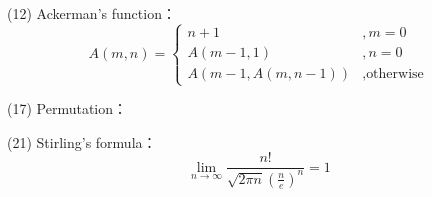 \item \begin{theorem}{(12)} Ackerman's function：\begin{equation}
        A(m, n) = \begin{cases}
            n + 1 &, m = 0 \\
            A(m - 1, 1) &, n = 0 \\
            A(m - 1, A(m, n - 1)) &, \text{otherwise}
        \end{cases}
    \end{equation}
\end{theorem}

\item \begin{theorem}{(17)} Permutation：
    \begin{algorithm}[H]
        \begin{algorithmic}[1]
                    \State {}
                \Else
                        \State {}
                        \State {}
                        \State {}
                    \EndFor
                \EndIf
            \EndFunction
        \end{algorithmic}
    \end{algorithm}
\end{theorem}

\item \begin{theorem}{(21)} Stirling's formula：\begin{equation}
        \lim_{n \rightarrow \infty}\frac{n!}{\sqrt{2\pi n}(\frac{n}{e})^n} = 1
    \end{equation}
\end{theorem}

